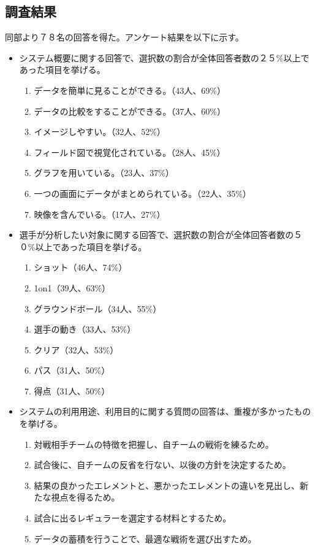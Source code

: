 \documentclass[sotsuron]{kuee}
\begin{document}
\subsection{調査結果}
同部より７８名の回答を得た。アンケート結果を以下に示す。
\begin{itemize}
\item システム概要に関する回答で、選択数の割合が全体回答者数の２５\%以上であった項目を挙げる。
	\begin{enumerate}
	\item データを簡単に見ることができる。（43人、69\%）
	\item データの比較をすることができる。（37人、60\%）
	\item イメージしやすい。（32人、52\%）
	\item フィールド図で視覚化されている。（28人、45\%）
	\item グラフを用いている。（23人、37\%）
	\item 一つの画面にデータがまとめられている。（22人、35\%）
	\item 映像を含んでいる。（17人、27\%）
	\end{enumerate}
\item 選手が分析したい対象に関する回答で、選択数の割合が全体回答者数の５０\%以上であった項目を挙げる。
	\begin{enumerate}
	\item ショット（46人、74\%）
	\item 1on1（39人、63\%）
	\item グラウンドボール（34人、55\%）
	\item 選手の動き（33人、53\%）
	\item クリア（32人、53\%）
	\item パス（31人、50\%）
	\item 得点（31人、50\%）
	\end{enumerate}
\item システムの利用用途、利用目的に関する質問の回答は、重複が多かったものを挙げる。
	\begin{enumerate}
	\item 対戦相手チームの特徴を把握し、自チームの戦術を練るため。
	\item 試合後に、自チームの反省を行ない、以後の方針を決定するため。
	\item 結果の良かったエレメントと、悪かったエレメントの違いを見出し、新たな視点を得るため。
	\item 試合に出るレギュラーを選定する材料とするため。
	\item データの蓄積を行うことで、最適な戦術を選び出すため。
	\end{enumerate}
\end{itemize}
\end{document}
